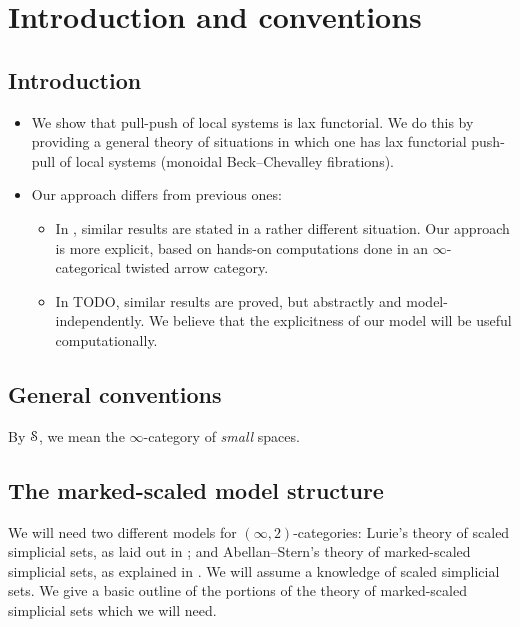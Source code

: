 \documentclass[main.tex]{subfiles}
\begin{document}
\section{Introduction and conventions}
\label{sec:introduction_and_conventions}

\subsection{Introduction}
\label{ssc:introduction}

\begin{itemize}
  \item We show that pull-push of local systems is lax functorial. We do this by providing a general theory of situations in which one has lax functorial push-pull of local systems (monoidal Beck--Chevalley fibrations).

  \item Our approach differs from previous ones:
    \begin{itemize}
      \item In \cite{spectralmackeyfunctors2}, similar results are stated in a rather different situation. Our approach is more explicit, based on hands-on computations done in an $\infty$-categorical twisted arrow category.

      \item In TODO, similar results are proved, but abstractly and model-independently. We believe that the explicitness of our model will be useful computationally.
    \end{itemize}
\end{itemize}


\subsection{General conventions}
\label{ssc:general_conventions}

By $\S$, we mean the $\infty$-category of \emph{small} spaces.

\subsection{The marked-scaled model structure}
\label{ssc:marked-scaled_model_structure}

We will need two different models for $(\infty,2)$-categories: Lurie's theory of scaled simplicial sets, as laid out in \cite{lurie2009infinity}; and Abellan--Stern's theory of marked-scaled simplicial sets, as explained in \cite{garcia2cartesianfibrationsii}. We will assume a knowledge of scaled simplicial sets. We give a basic outline of the portions of the theory of marked-scaled simplicial sets which we will need.
\end{document}
